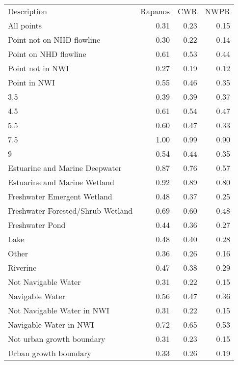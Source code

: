 \begin{tabular}{lrrr}
Description & Rapanos & CWR & NWPR \\
All points & 0.31 & 0.23 & 0.15 \\
Point not on NHD flowline & 0.30 & 0.22 & 0.14 \\
Point on NHD flowline & 0.61 & 0.53 & 0.44 \\
Point not in NWI & 0.27 & 0.19 & 0.12 \\
Point in NWI & 0.55 & 0.46 & 0.35 \\
3.5 & 0.39 & 0.39 & 0.37 \\
4.5 & 0.61 & 0.54 & 0.47 \\
5.5 & 0.60 & 0.47 & 0.33 \\
7.5 & 1.00 & 0.99 & 0.90 \\
9 & 0.54 & 0.44 & 0.35 \\
Estuarine and Marine Deepwater & 0.87 & 0.76 & 0.57 \\
Estuarine and Marine Wetland & 0.92 & 0.89 & 0.80 \\
Freshwater Emergent Wetland & 0.48 & 0.37 & 0.25 \\
Freshwater Forested/Shrub Wetland & 0.69 & 0.60 & 0.48 \\
Freshwater Pond & 0.44 & 0.36 & 0.27 \\
Lake & 0.48 & 0.40 & 0.28 \\
Other & 0.36 & 0.26 & 0.16 \\
Riverine & 0.47 & 0.38 & 0.29 \\
Not Navigable Water & 0.31 & 0.22 & 0.15 \\
Navigable Water & 0.56 & 0.47 & 0.36 \\
Not Navigable Water in NWI & 0.31 & 0.22 & 0.15 \\
Navigable Water in NWI & 0.72 & 0.65 & 0.53 \\
Not urban growth boundary & 0.31 & 0.23 & 0.15 \\
Urban growth boundary & 0.33 & 0.26 & 0.19 \\
\end{tabular}
